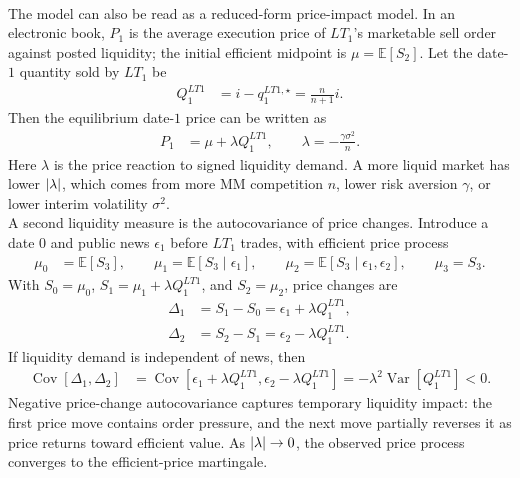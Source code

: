 \begin{model}
\par\smallskip\noindent{}\\
The model can also be read as a reduced-form price-impact model. In an electronic book, $P_1$ is the average execution price of $LT_1$'s marketable sell order against posted liquidity; the initial efficient midpoint is $\mu=\mathbb{E}[S_2]$. Let the date-$1$ quantity sold by $LT_1$ be
\begin{align*}
Q_1^{LT1}&=i-q_1^{LT1,\star}=\frac{n}{n+1}i.
\end{align*}
Then the equilibrium date-$1$ price can be written as
\begin{align*}
P_1&=\mu+\lambda Q_1^{LT1}, \qquad
\lambda=-\frac{\gamma\sigma^2}{n}.
\end{align*}
Here $\lambda$ is the price reaction to signed liquidity demand. A more liquid market has lower $\left\lvert\lambda\right\rvert$, which comes from more MM competition $n$, lower risk aversion $\gamma$, or lower interim volatility $\sigma^2$.\\
A second liquidity measure is the autocovariance of price changes. Introduce a date $0$ and public news $\epsilon_1$ before $LT_1$ trades, with efficient price process
\begin{align*}
\mu_0&=\mathbb{E}[S_3], \qquad
\mu_1=\mathbb{E}[S_3\mid\epsilon_1], \qquad
\mu_2=\mathbb{E}[S_3\mid\epsilon_1,\epsilon_2], \qquad
\mu_3=S_3.
\end{align*}
With $S_0=\mu_0$, $S_1=\mu_1+\lambda Q_1^{LT1}$, and $S_2=\mu_2$, price changes are
\begin{align*}
\Delta_1&=S_1-S_0=\epsilon_1+\lambda Q_1^{LT1},\\
\Delta_2&=S_2-S_1=\epsilon_2-\lambda Q_1^{LT1}.
\end{align*}
If liquidity demand is independent of news, then
\begin{align*}
\operatorname{Cov}[\Delta_1,\Delta_2]
&=\operatorname{Cov}[\epsilon_1+\lambda Q_1^{LT1},\epsilon_2-\lambda Q_1^{LT1}]
=-\lambda^2\operatorname{Var}[Q_1^{LT1}]<0.
\end{align*}
Negative price-change autocovariance captures temporary liquidity impact: the first price move contains order pressure, and the next move partially reverses it as price returns toward efficient value. As $\left\lvert\lambda\right\rvert\to0$, the observed price process converges to the efficient-price martingale.
\end{model}

